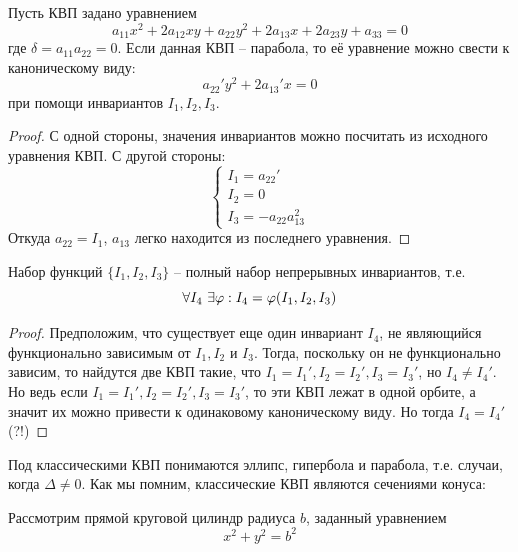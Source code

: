 \begin{Thm}
	Пусть КВП задано уравнением
	\[a_{11} x^2 + 2a_{12}xy + a_{22}y^2 + 2a_{13}x + 2a_{23}y + a_{33} = 0\]
	где $\delta = a_{11} a_{22} = 0$. Если данная КВП -- парабола, то её уравнение можно свести к каноническому виду:
	\[a_{22}' y^2 + 2 a_{13}' x = 0\]
	при помощи инвариантов $I_1, I_2, I_3$. 
\end{Thm}

\begin{proof}
	С одной стороны, значения инвариантов можно посчитать из исходного уравнения КВП. С другой стороны:
	\[\begin{cases}
		I_1 = a_{22}' \\
		I_2 = 0 \\
		I_3 = -a_{22} a_{13}^2
	\end{cases}\]
	Откуда $a_{22} = I_1$, $a_{13}$ легко находится из последнего уравнения.
\end{proof}

\begin{Prop}
	Набор функций $\{I_1, I_2, I_3\}$ -- полный набор непрерывных инвариантов, т.е.
	\[\forall I_4 \ \exists \varphi : I_4 = \varphi(I_1, I_2, I_3)\]
\end{Prop}

\begin{proof}
	Предположим, что существует еще один инвариант $I_4$, не являющийся функционально зависимым от $I_1, I_2$ и $I_3$.
	Тогда, поскольку он не функционально зависим, то найдутся две КВП такие, что $I_1 = I_1', I_2 = I_2', I_3 = I_3'$, но $I_4 \neq I_4'$.
	Но ведь если $I_1 = I_1', I_2 = I_2', I_3 = I_3'$, то эти КВП лежат в одной орбите, а значит их можно привести к одинаковому каноническому виду.
	Но тогда $I_4 = I_4'$ (?!)
\end{proof}


Под классическими КВП понимаются эллипс, гипербола и парабола, т.е. случаи, когда $\Delta \neq 0$.
Как мы помним, классические КВП являются сечениями конуса:

\begin{figure}[H]
	\centering
	\def\svgwidth{.3\columnwidth}
	
\end{figure}

Рассмотрим прямой круговой цилиндр радиуса $b$, заданный уравнением
\[x^2 + y^2 = b^2\] 

\begin{figure}[h]
	\centering
	\def\svgwidth{.8\columnwidth}
	
\end{figure}

